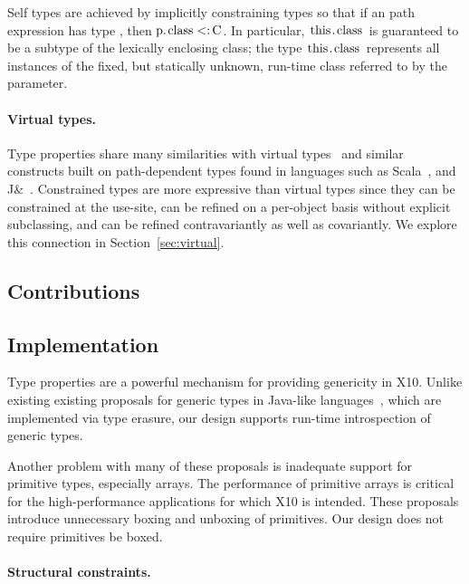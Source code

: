 \documentclass[preprint,nocopyrightspace,9pt]{sigplanconf}
\begin{document}
Self types are achieved by
implicitly constraining types so that if an path expression 
has type , then
$\Xcd{p}.\Xcd{class} \subtype \Xcd{C}$.  In particular,
$\Xcd{this}.\Xcd{class}$ is guaranteed to be a subtype
of the lexically enclosing class; the type
$\Xcd{this}.\Xcd{class}$ represents all instances of the fixed,
but statically unknown, run-time class referred to by the 
parameter.

\paragraph{Virtual types.}

Type properties share many similarities with virtual
types~\cite{mp89-virtual-classes,beta,ernst99-gbeta,ernst06-virtual,cdnw07-tribe}
and similar constructs built on path-dependent types found in
languages such as Scala~\cite{scala}, and J\&~\cite{nqm06}.
%
Constrained types are more expressive than virtual
types since they can be constrained at the use-site,
can be refined on a per-object basis without explicit subclassing,
and can be refined contravariantly
as well as covariantly.  We explore this connection in
Section~\ref{sec:virtual}.

\subsection{Contributions}


\subsection{Implementation}

Type properties are a powerful mechanism
for providing genericity in X10.
Unlike existing 
existing proposals for generic types in
Java-like
languages~\cite{Java3,adding-wildcards,GJ,Pizza,polyj,thorup97,allen03,allen04,csharp,emir06,scala},
which 
are implemented via type erasure,
our design supports run-time introspection of generic types.

Another problem with many of these proposals is inadequate support
for primitive types, especially arrays. The performance of primitive arrays is
critical for the high-performance applications for which
X10 is intended. These proposals introduce unnecessary boxing
and unboxing of primitives.
Our design does not require primitives be boxed.

\paragraph{Structural constraints.}
\end{document}
